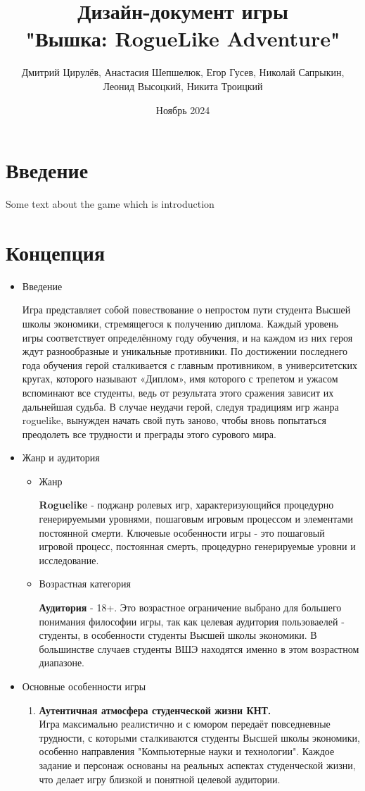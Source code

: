 \documentclass{article}
\title{Дизайн-документ игры \\"Вышка: RogueLike Adventure"}
\author{Дмитрий Цирулёв, Анастасия Шепшелюк, Егор Гусев, Николай Сапрыкин, Леонид Высоцкий, Никита Троицкий }
\date{Ноябрь 2024}
\begin{document}
\maketitle

\tableofcontents
\newpage
\section{Введение}
Some text about the game which is introduction
\newpage
\section{Концепция}
\begin{itemize}
    \item Введение \par
      Игра представляет собой повествование о непростом пути студента Высшей школы экономики, стремящегося к получению диплома. Каждый уровень игры соответствует определённому году обучения, и на каждом из них героя ждут разнообразные и уникальные противники. По достижении последнего года обучения герой сталкивается с главным противником, в университетских кругах, которого называют «Диплом», имя которого с трепетом и ужасом вспоминают все студенты, ведь от результата этого сражения зависит их дальнейшая судьба. В случае неудачи герой, следуя традициям игр жанра roguelike, вынужден начать свой путь заново, чтобы вновь попытаться преодолеть все трудности и преграды этого сурового мира.
    \item Жанр и аудитория
    \begin{itemize}
        \item Жанр \par
        \textbf{Roguelike} - поджанр ролевых игр, характеризующийся процедурно генерируемыми уровнями, пошаговым игровым процессом и элементами постоянной смерти. Ключевые особенности игры - это пошаговый игровой процесс, постоянная смерть, процедурно генерируемые уровни и исследование. 
        \item Возрастная категория \par
        \textbf{Аудитория} - 18+. Это возрастное ограничение выбрано для большего понимания философии игры, так как целевая аудитория пользоваелей - студенты, в особенности студенты Высшей школы экономики. В большинстве случаев студенты ВШЭ находятся именно в этом возрастном диапазоне.
    \end{itemize}
    \item Основные особенности игры
    \begin{enumerate}
    \item \textbf{Аутентичная атмосфера студенческой жизни КНТ.} \\
    Игра максимально реалистично и с юмором передаёт повседневные трудности, с которыми сталкиваются студенты Высшей школы экономики, особенно направления "Компьютерные науки и технологии". Каждое задание и персонаж основаны на реальных аспектах студенческой жизни, что делает игру близкой и понятной целевой аудитории.


\end{enumerate}
\end{itemize}
\end{document}
